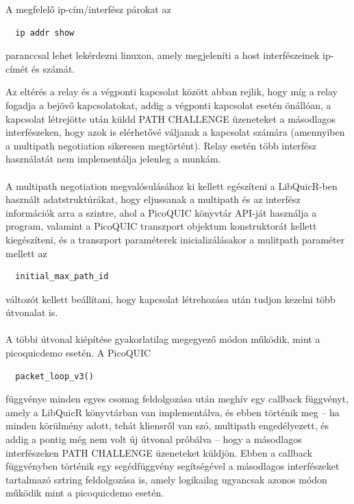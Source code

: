 \documentclass[a4paper,oneside]{article}
\begin{document}
A megfelelő ip-cím/interfész párokat az 
\begin{verbatim}
  ip addr show
\end{verbatim}
paranccsal lehet lekérdezni linuxon, amely megjeleníti a host interfészeinek ip-címét és számát.

Az eltérés a relay és a végponti kapcsolat között abban rejlik, hogy míg a relay fogadja a bejövő kapcsolatokat, addig a végponti kapcsolat esetén önállóan,
a kapcsolat létrejötte után küldd PATH CHALLENGE üzeneteket a másodlagos interfészeken, 
hogy azok is elérhetővé váljanak a kapcsolat számára (amennyiben a multipath negotiation sikeresen megtörtént).
Relay esetén több interfész használatát nem implementálja jelenleg a munkám.

\paragraph{}

A multipath negotiation megvalósulásához ki kellett egészíteni a LibQuicR-ben
használt adatstruktúrákat, hogy eljussanak a multipath és az interfész információk
arra a szintre, ahol a PicoQUIC könyvtár API-ját használja a program, valamint 
a PicoQUIC transzport objektum konstruktorát 
kellett kiegészíteni, és a transzport paraméterek inicializálásakor a mulitpath paraméter mellett az 
\begin{verbatim}
  initial_max_path_id
\end{verbatim}
változót kellett beállítani, hogy kapcsolat létrehozása után tudjon kezelni több útvonalat is.

\paragraph{}

A többi útvonal kiépítése gyakorlatilag megegyező módon működik, mint a picoquicdemo esetén. A PicoQUIC 
\begin{verbatim}
  packet_loop_v3()
\end{verbatim}
függvénye minden egyes csomag feldolgozása után meghív egy callback függvényt, amely a LibQuicR könyvtárban van 
implementálva, és ebben történik meg – ha minden körülmény adott, tehát kliensről van szó, 
multipath engedélyezett, és addig a pontig még nem volt új útvonal próbálva – hogy a másodlagos interfészeken PATH CHALLENGE üzeneteket küldjön.
Ebben a callback függvényben történik egy segédfüggvény segítségével a másodlagos interfészeket tartalmazó sztring feldolgozása is, amely logikailag
ugyancsak azonos módon működik mint a picoquicdemo esetén.
\end{document}
